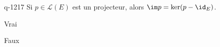 \begin{truefalse}{q-1217}
Si $p\in\mathcal{L}(E)$ est un projecteur, alors $\im p= \ker (p-\id_E)$.
\item* Vrai
\item Faux
\end{truefalse}

